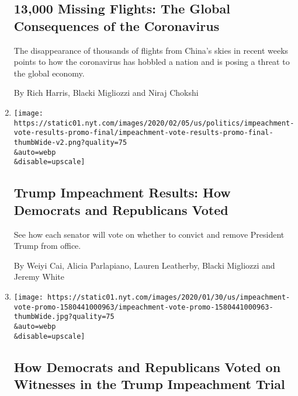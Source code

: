 \begin{enumerate}
  \hypertarget{13000-missing-flights-the-global-consequences-of-the-coronavirus}{%
  \subsection{13,000 Missing Flights: The Global Consequences of the
  Coronavirus}\label{13000-missing-flights-the-global-consequences-of-the-coronavirus}}

  The disappearance of thousands of flights from China's skies in recent
  weeks points to how the coronavirus has hobbled a nation and is posing
  a threat to the global economy.

  By Rich Harris, Blacki Migliozzi and Niraj Chokshi
\item
  \href{/interactive/2020/02/05/us/politics/impeachment-vote-results.html}{}

  \texttt{[image: https://static01.nyt.com/images/2020/02/05/us/politics/impeachment-vote-results-promo-final/impeachment-vote-results-promo-final-thumbWide-v2.png?quality=75\\\&auto=webp\\\&disable=upscale]}

  \hypertarget{trump-impeachment-results-how-democrats-and-republicans-voted}{%
  \subsection{Trump Impeachment Results: How Democrats and Republicans
  Voted}\label{trump-impeachment-results-how-democrats-and-republicans-voted}}

  See how each senator will vote on whether to convict and remove
  President Trump from office.

  By Weiyi Cai, Alicia Parlapiano, Lauren Leatherby, Blacki Migliozzi
  and Jeremy White
\item
  \href{/interactive/2020/01/31/us/politics/impeachment-vote.html}{}

  \texttt{[image: https://static01.nyt.com/images/2020/01/30/us/impeachment-vote-promo-1580441000963/impeachment-vote-promo-1580441000963-thumbWide.jpg?quality=75\\\&auto=webp\\\&disable=upscale]}

  \hypertarget{how-democrats-and-republicans-voted-on-witnesses-in-the-trump-impeachment-trial}{%
  \subsection{How Democrats and Republicans Voted on Witnesses in the
  Trump Impeachment
  Trial}\label{how-democrats-and-republicans-voted-on-witnesses-in-the-trump-impeachment-trial}}


\end{enumerate}
